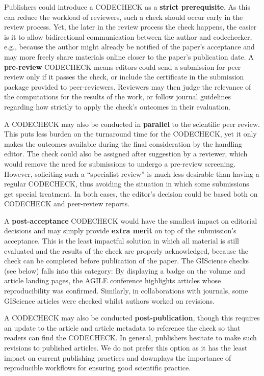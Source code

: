 \documentclass[12pt]{article}
\begin{document}
Publishers could introduce a CODECHECK as a \textbf{strict prerequisite}.
As this can reduce the workload of reviewers, such a check should occur early in the review process.
Yet, the later in the review process the check happens, the easier is it to allow bidirectional communication between the author and codechecker, e.g., because the author might already be notified of the paper's acceptance and may more freely share materials online closer to the paper's publication date.
A \textbf{pre-review} CODECHECK means editors could send a submission
for peer review only if it passes the check, or include the certificate in the submission package provided to peer-reviewers.
Reviewers may then judge the relevance of the computations for the results of the work, or follow journal guidelines regarding how strictly to apply the check's outcomes in their evaluation.

A CODECHECK may also be conducted in \textbf{parallel} to the scientific peer review.
This puts less burden on the turnaround time for the CODECHECK, yet it only makes the outcomes available during the final consideration by the handling editor.
The check could also be assigned after suggestion by a reviewer, which would remove the need for submissions to undergo a pre-review screening.
However, soliciting such a ``specialist review'' is much less
desirable than having a regular CODECHECK, thus avoiding the situation
in which some submissions get special treatment. In both cases, the
editor's decision could be based both on CODECHECK and peer-review reports.

A \textbf{post-acceptance} CODECHECK would have the smallest impact on
editorial decisions and may simply provide \textbf{extra merit} on top
of the submission's acceptance.  This is the least impactful solution
in which all material is still evaluated and the results of the check
are properly acknowledged, because the check can be completed before
publication of the paper.  The GIScience checks (see
below) falls into this category: By displaying a badge on the volume
and article landing pages, the AGILE conference highlights articles
whose reproducibility was confirmed.  Similarly, in
collaborations with journals, some GIScience articles were
checked whilst authors worked on revisions.

A CODECHECK may also be conducted \textbf{post-publication}, though
this requires an update to the article and article metadata to
reference the check so that readers can find the CODECHECK.  In
general, publishers hesitate to make such revisions to published
articles.  We do not prefer this option as it has the least impact on
current publishing practices and downplays the importance
of reproducible workflows for ensuring good scientific practice.
\end{document}
